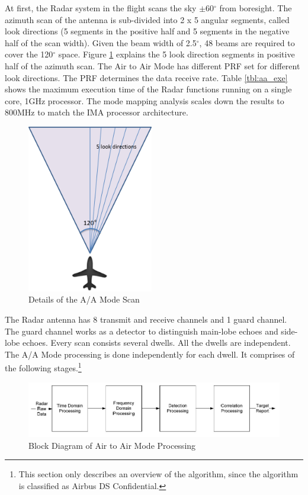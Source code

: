 At first, the Radar system in the flight scans the sky $\pm$60$^{\circ}$ from boresight. The azimuth scan of the antenna is sub-divided into 2 x 5 angular segments, called look directions (5 segments in the positive half and 5 segments in the negative half of the scan width). Given the beam width of 2.5$^{\circ}$, 48 beams are required to cover the 120$^{\circ}$ space. Figure \ref{fig:bg_related_work:aa_look_dir} explains the 5 look direction segments in positive half of the azimuth scan. The Air to Air Mode has different PRF set for different look directions. The PRF determines the data receive rate. Table \ref{tbl:aa_exe} shows the maximum execution time of the Radar functions running on a single core, 1GHz processor. The mode mapping analysis scales down the results to 800MHz to match the IMA processor architecture.

\begin{figure}[h!]
	\centering
	\includegraphics[width=55mm]{figures/look_dir}
	\caption{Details of the A/A Mode Scan}
	\label{fig:bg_related_work:aa_look_dir}
\end{figure}

The Radar antenna has 8 transmit and receive channels and 1 guard channel. The guard channel works as a detector to distinguish main-lobe echoes and side-lobe echoes. Every scan consists several dwells. All the dwells are independent. The A/A Mode processing is done independently for each dwell. It comprises of the following stages.\footnote{This section only describes an overview of the algorithm, since the algorithm is classified as Airbus DS Confidential.}

\begin{figure}[h!]
	\centering
	\includegraphics[width=160mm]{figures/aa_block_dia}
	\caption{Block Diagram of Air to Air Mode Processing}
	\label{fig:bg_related_work:aa_block_dia}
\end{figure}

